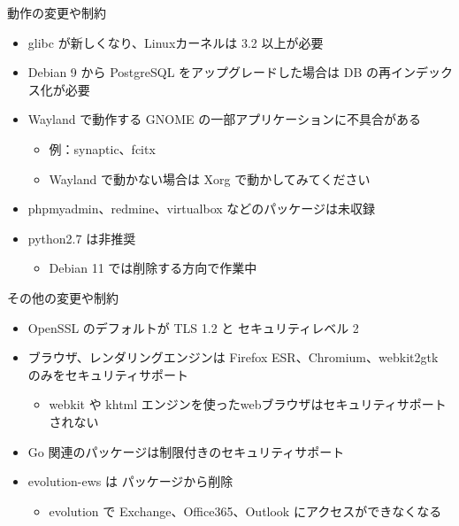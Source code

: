\begin{frame}{動作の変更や制約}%

\begin{itemize}
\item glibc が新しくなり、Linuxカーネルは 3.2 以上が必要
\item Debian 9 から PostgreSQL をアップグレードした場合は DB の再インデックス化が必要
\item Wayland で動作する GNOME の一部アプリケーションに不具合がある
  \begin{itemize}
  \item 例：synaptic、fcitx
  \item Wayland で動かない場合は Xorg で動かしてみてください
  \end{itemize}
\item phpmyadmin、redmine、virtualbox などのパッケージは未収録
\item python2.7 は非推奨
  \begin{itemize}
  \item Debian 11 では削除する方向で作業中
  \end{itemize}
\end{itemize}

\end{frame}


\begin{frame}{その他の変更や制約}%

\begin{itemize}
\item OpenSSL のデフォルトが TLS 1.2 と セキュリティレベル 2
\item ブラウザ、レンダリングエンジンは Firefox ESR、Chromium、webkit2gtk のみをセキュリティサポート
  \begin{itemize}
  \item webkit や khtml エンジンを使ったwebブラウザはセキュリティサポートされない
  \end{itemize}
\item Go 関連のパッケージは制限付きのセキュリティサポート
\item evolution-ews は パッケージから削除
  \begin{itemize}
  \item evolution で Exchange、Office365、Outlook にアクセスができなくなる
  \end{itemize}
\end{itemize}

\end{frame}



